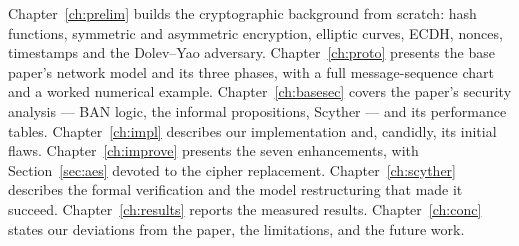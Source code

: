 Chapter~\ref{ch:prelim} builds the cryptographic background from scratch: hash functions,
symmetric and asymmetric encryption, elliptic curves, ECDH, nonces, timestamps and the
Dolev--Yao adversary. Chapter~\ref{ch:proto} presents the base paper's network model and its
three phases, with a full message-sequence chart and a worked numerical example.
Chapter~\ref{ch:basesec} covers the paper's security analysis --- BAN logic, the informal
propositions, Scyther --- and its performance tables. Chapter~\ref{ch:impl} describes our
implementation and, candidly, its initial flaws. Chapter~\ref{ch:improve} presents the seven
enhancements, with Section~\ref{sec:aes} devoted to the cipher replacement.
Chapter~\ref{ch:scyther} describes the formal verification and the model restructuring that
made it succeed. Chapter~\ref{ch:results} reports the measured results.
Chapter~\ref{ch:conc} states our deviations from the paper, the limitations, and the future
work.

